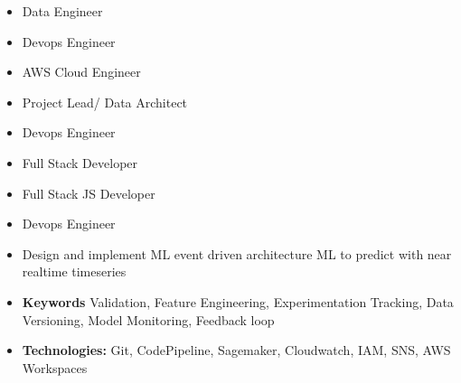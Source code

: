 \documentclass[10pt,a4paper,normalphoto]{altacv}
\begin{document}
\begin{paracol}{2}

\begin{itemize}
\item Data Engineer
\item Devops Engineer
\item AWS Cloud Engineer
\end{itemize}
\divider


\begin{itemize}
\item Project Lead/ Data Architect
\item Devops Engineer
\item Full Stack Developer
\end{itemize}

\divider

\begin{itemize}
\item Full Stack JS Developer
\item Devops Engineer
\end{itemize}


\begin{itemize}
\item Design and implement ML event driven architecture  ML to predict with near realtime timeseries
\item \textbf{Keywords } Validation, Feature Engineering, Experimentation Tracking, Data Versioning, Model Monitoring, Feedback loop
\item \textbf{Technologies:} Git, CodePipeline, Sagemaker, Cloudwatch, IAM, SNS, AWS Workspaces
\end{itemize}
\divider


\end{paracol}
\end{document}
